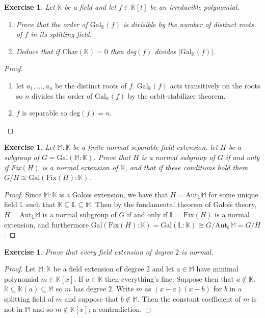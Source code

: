 \documentclass{article}
\newtheorem{exercise}[theorem]{Exercise}
\begin{document}
\begin{exercise}
Let $\mathbb{K}$ be a field and let $f\in\mathbb{K}[t]$ be an irreducible polynomial.
\begin{enumerate}[label=(\roman*)]
    \item Prove that the order of $\text{Gal}_\mathbb{K}(f)$ is divisible by the number of distinct roots of $f$ in its splitting field.
    \item Deduce that if $\text{Char}(\mathbb{K})=0$ then deg$(f)$ divides $|\text{Gal}_\mathbb{K}(f)|$.
\end{enumerate}
\end{exercise}
\begin{proof}
\begin{enumerate}[label=(\roman*)]
    \item let $a_1,...,a_n$ be the distinct roots of $f$. $\text{Gal}_\mathbb{K}(f)$ acts transitively on the roots so $n$ divides the order of $\text{Gal}_\mathbb{K}(f)$ by the orbit-stabilizer theorem.
    \item $f$ is separable so $\text{deg}(f)=n$.
\end{enumerate}
\end{proof}


\begin{exercise}
Let $\mathbb{M}:\mathbb{K}$ be a finite normal separable field extension. let $H$ be a subgroup of $G=\text{Gal}(\mathbb{M}:\mathbb{K})$. Prove that $H$ is a normal subgroup of $G$ if and only if Fix$(H)$ is a normal extension of $\mathbb{K}$, and that if these conditions hold them $G/H\cong\text{Gal}(\text{Fix}(H):\mathbb{K})$.
\end{exercise}
\begin{proof}
Since $\mathbb{M}:\mathbb{K}$ is a Galois extension, we have that $H=\text{Aut}_\mathbb{L}\mathbb{M}$ for some unique field $\mathbb{L}$ such that $\mathbb{K}\subseteq\mathbb{L}\subseteq\mathbb{M}$. Then by the fundamental theorem of Galois theory, $H=\text{Aut}_\mathbb{L}\mathbb{M}$ is a normal subgroup of $G$ if and only if $\mathbb{L}=\text{Fix}(H)$ is a normal extension, and furthermore $\text{Gal}(\text{Fix}(H):\mathbb{K})=\text{Gal}(\mathbb{L}:\mathbb{K})\cong G/\text{Aut}_\mathbb{L}\mathbb{M}=G/H$.
\end{proof}

\begin{exercise}
Prove that every field extension of degree $2$ is normal.
\end{exercise}
\begin{proof}
Let $\mathbb{M}:\mathbb{K}$ be a field extension of degree $2$ and let $a\in\mathbb{M}$ have minimal polynomial $m\in\mathbb{K}[x]$. If $a\in\mathbb{K}$ then everything's fine. Suppose then that $a\not\in\mathbb{K}$. $\mathbb{K}\subseteq\mathbb{K}(a)\subseteq\mathbb{M}$ so $m$ has degree $2$. Write $m$ as $(x-a)(x-b)$ for $b$ in a splitting field of $m$ and suppose that $b\not\in\mathbb{M}$. Then the constant coefficient of $m$ is not in $\mathbb{M}$ and so $m\not\in\mathbb{K}[x]$; a contradiction.
\end{proof}
\end{document}
